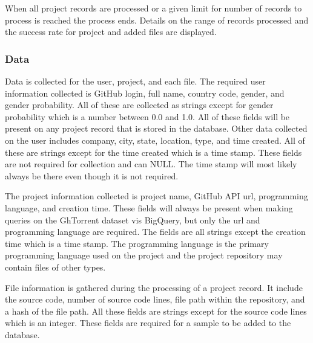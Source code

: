 \documentclass{article}
\begin{document}
When all project records are processed or a given limit for number of records to process is reached the process ends. Details on the range of records processed and the success rate for project and added files are displayed.

\subsubsection*{Data}
Data is collected for the user, project, and each file. The required user information collected is GitHub login, full name, country code, gender, and gender probability. All of these are collected as strings except for gender probability which is a number between 0.0 and 1.0. All of these fields will be present on any project record that is stored in the database. Other data collected on the user includes company, city, state, location, type, and time created. All of these are strings except for the time created which is a time stamp. These fields are not required for collection and can NULL. The time stamp will most likely always be there even though it is not required.

The project information collected is project name, GitHub API url, programming language, and creation time. These fields will always be present when making queries on the GhTorrent dataset vis BigQuery, but only the url and programming language are required. The fields are all strings except the creation time which is a time stamp. The programming language is the primary programming language used on the project and the project repository may contain files of other types.

File information is gathered during the processing of a project record. It include the source code, number of source code lines, file path within the repository, and a hash of the file path. All these fields are strings except for the source code lines which is an integer. These fields are required for a sample to be added to the database.
\end{document}
